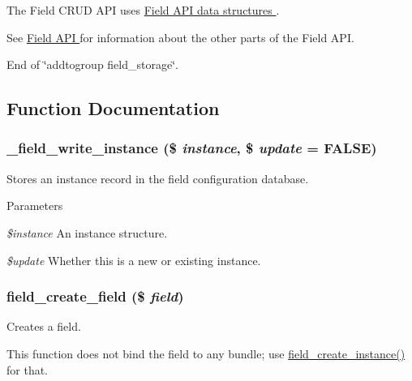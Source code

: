 The Field CRUD API uses \hyperlink{group__field}{Field API data structures }.

See \hyperlink{group__field}{Field API } for information about the other parts of the Field API.

End of \char`\"{}addtogroup field\_\-storage\char`\"{}. 

\subsection{Function Documentation}
\hypertarget{group__field__crud_ga83dc14176ea710466ba351c1883074c9}{
\subsubsection[{\_\-field\_\-write\_\-instance}]{\setlength{\rightskip}{0pt plus 5cm}\_\-field\_\-write\_\-instance (\$ {\em instance}, \/  \$ {\em update} = {\ttfamily FALSE})}}
\label{group__field__crud_ga83dc14176ea710466ba351c1883074c9}
Stores an instance record in the field configuration database.


\begin{DoxyParams}{Parameters}
\item[{\em \$instance}]An instance structure. \item[{\em \$update}]Whether this is a new or existing instance. \end{DoxyParams}
\hypertarget{group__field__crud_ga0f879889d2da2b5d638252d7eb027746}{
\subsubsection[{field\_\-create\_\-field}]{\setlength{\rightskip}{0pt plus 5cm}field\_\-create\_\-field (\$ {\em field})}}
\label{group__field__crud_ga0f879889d2da2b5d638252d7eb027746}
Creates a field.

This function does not bind the field to any bundle; use \hyperlink{group__field__crud_ga3a1e23613d572a6e908e063c3a0335f8}{field\_\-create\_\-instance()} for that.


